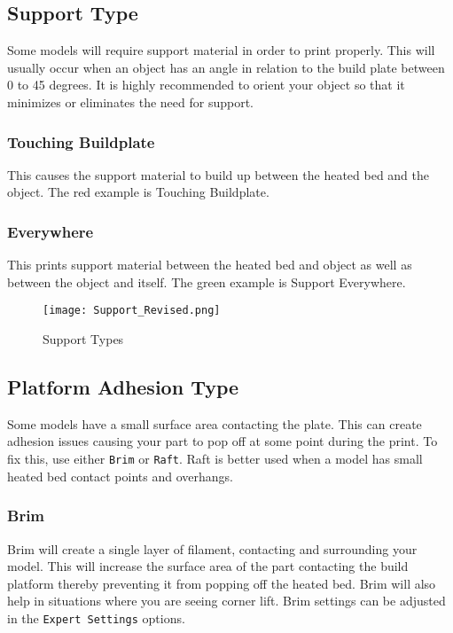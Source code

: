 \subsection{Support Type}
Some models will require support material in order to print properly. This will usually occur when an object has an angle in relation to the build plate between 0 to 45 degrees. It is highly recommended to orient your object so that it minimizes or eliminates the need for support.

\subsubsection{Touching Buildplate}
This causes the support material to build up between the heated bed and the object. The red example is Touching Buildplate.

\subsubsection{Everywhere}
This prints support material between the heated bed and object as well as between the object and itself. The green example is Support Everywhere.
\begin{figure}[H]
\centering
\texttt{[image: Support\_Revised.png]}
\caption{Support Types}
\label{fig:Different Types of Support}
\end{figure}

\subsection{Platform Adhesion Type}
Some models have a small surface area contacting the plate. This can create adhesion issues causing your part to pop off at some point during the print. To fix this, use either \texttt{Brim} or \texttt{Raft}. Raft is better used when a model has small heated bed contact points and overhangs.

\subsubsection{Brim}
Brim will create a single layer of filament, contacting and surrounding your model. This will increase the surface area of the part contacting the build platform thereby preventing it from popping off the heated bed. Brim will also help in situations where you are seeing corner lift. Brim settings can be adjusted in the \texttt{Expert Settings} options.

